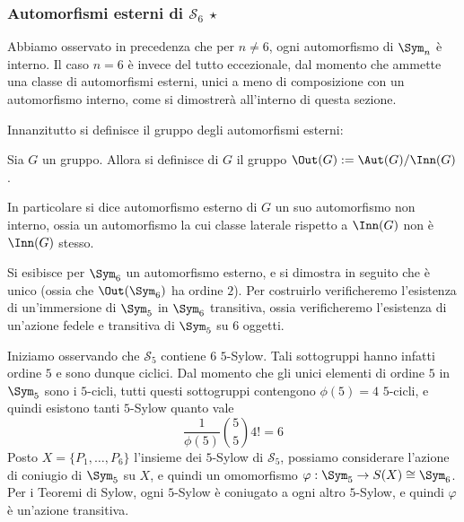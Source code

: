 \documentclass[11pt]{scrartcl}
\begin{document}
	\subsubsection{Automorfismi esterni di \texorpdfstring{$\mathcal{S}_6$}{S₆} \texorpdfstring{$\star$}{★}}
	
	Abbiamo osservato in precedenza che per $n \neq 6$, ogni automorfismo di $\Sym_n$ è interno.
	Il caso $n = 6$ è invece del tutto eccezionale, dal momento che ammette una classe di automorfismi
	esterni, unici a meno di composizione con un automorfismo interno, come si dimostrerà all'interno
	di questa sezione. \medskip
	
	
	Innanzitutto si definisce il gruppo degli automorfismi esterni:

	\begin{definition}
		Sia $G$ un gruppo. Allora si definisce  di $G$
		il gruppo $\Out(G) := \Aut(G) / \Inn(G)$.
	\end{definition}
	
	In particolare si dice automorfismo esterno di $G$ un suo automorfismo non interno, ossia
	un automorfismo la cui classe laterale rispetto a $\Inn(G)$ non è $\Inn(G)$ stesso. \medskip
	

	Si esibisce per $\Sym_6$ un automorfismo esterno, e si dimostra in seguito che è unico
	(ossia che $\Out(\Sym_6)$ ha ordine $2$). Per costruirlo verificheremo l'esistenza di
	un'immersione di $\Sym_5$ in $\Sym_6$ transitiva, ossia verificheremo l'esistenza di
	un'azione fedele e transitiva di $\Sym_5$ su $6$ oggetti. \medskip
	

	Iniziamo osservando che $\mathcal{S}_5$ contiene $6$ $5$-Sylow. Tali sottogruppi hanno infatti
	ordine $5$ e sono dunque ciclici. Dal momento che gli unici elementi di ordine $5$ in
	$\Sym_5$ sono i $5$-cicli, tutti questi sottogruppi contengono $\phi(5) = 4$
	$5$-cicli, e quindi esistono tanti $5$-Sylow quanto vale
	\[ \frac{1}{\phi(5)} \binom{5}{5}4! = 6 \]
	Posto $X = \{P_1, \ldots, P_6\}$ l'insieme dei $5$-Sylow di $\mathcal{S}_5$, possiamo considerare
	l'azione di coniugio di $\Sym_5$ su $X$, e quindi un omomorfismo $\varphi : \Sym_5 \to S(X) \cong \Sym_6$.
	Per i Teoremi di Sylow, ogni $5$-Sylow è coniugato a ogni altro $5$-Sylow, e quindi $\varphi$ è
	un'azione transitiva. \medskip
	
\end{document}
